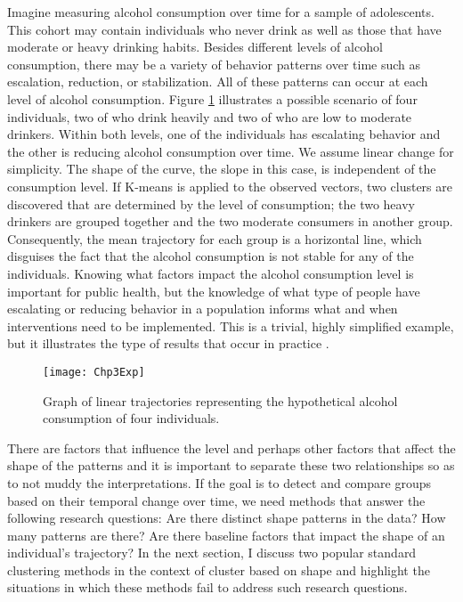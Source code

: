 Imagine measuring alcohol consumption over time for a sample of adolescents. This cohort may contain individuals who never drink as well as those that have moderate or heavy drinking habits. Besides different levels of alcohol consumption, there may be a variety of behavior patterns over time such as escalation, reduction, or stabilization. All of these patterns can occur at each level of alcohol consumption. Figure \ref{fig:3-1} illustrates a possible scenario of four individuals, two of who drink heavily and two of who are low to moderate drinkers. Within both levels, one of the individuals has escalating behavior and the other is reducing alcohol consumption over time. We assume linear change for simplicity. The shape of the curve, the slope in this case, is independent of the consumption level. If K-means is applied to the observed vectors, two clusters are discovered that are determined by the level of consumption; the two heavy drinkers are grouped together and the two moderate consumers in another group. Consequently, the mean trajectory for each group is a horizontal line, which disguises the fact that the alcohol consumption is not stable for any of the individuals. Knowing what factors impact the alcohol consumption level is important for public health, but the knowledge of what type of people have escalating or reducing behavior in a population informs what and when interventions need to be implemented. This is a trivial, highly simplified example, but it illustrates the type of results that occur in practice \cite{mccoy2010}.

\begin{figure}
\begin{center}
\texttt{[image: Chp3Exp]}
\end{center}
\caption{Graph of linear trajectories representing the hypothetical alcohol consumption of four individuals.}
\label{fig:3-1}
\end{figure}

There are factors that influence the level and perhaps other factors that affect the shape of the patterns and it is important to separate these two relationships so as to not muddy the interpretations. If the goal is to detect and compare groups based on their temporal change over time, we need methods that answer the following research questions: Are there distinct shape patterns in the data? How many patterns are there? Are there baseline factors that impact the shape of an individual's trajectory? In the next section, I discuss two popular standard clustering methods in the context of cluster based on shape and highlight the situations in which these methods fail to address such research questions. 


